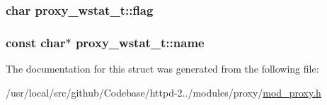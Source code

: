 \subsubsection[{\texorpdfstring{flag}{flag}}]{\setlength{\rightskip}{0pt plus 5cm}char proxy\+\_\+wstat\+\_\+t\+::flag}\hypertarget{structproxy__wstat__t_a7c72e98eb351fdd5e39c7c6dd6f60190}{}\label{structproxy__wstat__t_a7c72e98eb351fdd5e39c7c6dd6f60190}
\subsubsection[{\texorpdfstring{name}{name}}]{\setlength{\rightskip}{0pt plus 5cm}const char$\ast$ proxy\+\_\+wstat\+\_\+t\+::name}\hypertarget{structproxy__wstat__t_a63e450026fda59aed6d9620fb569f320}{}\label{structproxy__wstat__t_a63e450026fda59aed6d9620fb569f320}


The documentation for this struct was generated from the following file\+:\begin{DoxyCompactItemize}
\item 
/usr/local/src/github/\+Codebase/httpd-\/2../modules/proxy/\hyperlink{mod__proxy_8h}{mod\+\_\+proxy.\+h}\end{DoxyCompactItemize}
